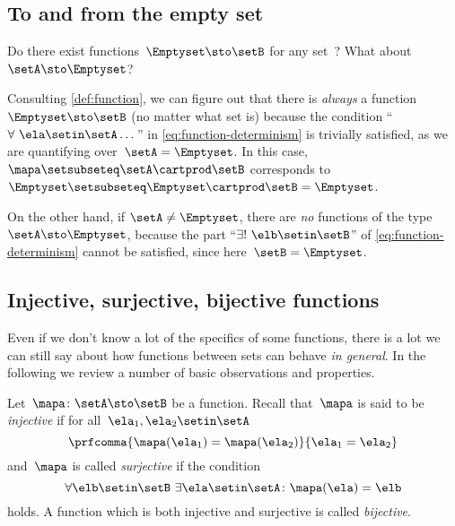 \subsection{To and from the empty set}

Do there exist functions~$\Emptyset \sto \setB$ for any set~\setB?
What about~$\setA \sto \Emptyset$?

Consulting \cref{def:function}, we can figure out that there is \emph{always} a function $\Emptyset \sto \setB$ (no matter what set \setB is) because the condition ``$\forall \ \ela \setin\setA \dots$'' in \cref{eq:function-determinism} is trivially satisfied, as we are quantifying over~$\setA = \Emptyset$.
In this case,~$\mapa \setsubseteq \setA \cartprod \setB$ corresponds to~$\Emptyset \setsubseteq \Emptyset \cartprod \setB = \Emptyset$.

On the other hand, if $\setA \neq \Emptyset$, there are \emph{no} functions of the type~$\setA \sto \Emptyset$, because the part ``$\exists ! \ \elb \setin\setB$'' of \cref{eq:function-determinism} cannot be satisfied, since here~$\setB = \Emptyset$.

\subsection{Injective, surjective, bijective functions}
\label{sub:injective-and-surjective}

Even if we don't know a lot of the specifics of some functions, there is a lot we can still say about how functions between sets can behave \emph{in general}.
In the following we review a number of basic observations and properties.

Let~$\mapa\colon \setA \sto \setB$ be a function.
Recall that~$\mapa$ is said to be \emph{injective} if for all~$\ela_1, \ela_2 \setin\setA$
\begin{equation}
    \label{eq:injectivity-cond}
    \prfcomma{
        \mapa(\ela_1) = \mapa(\ela_2)
    }{
        \ela_1 = \ela_2
    }
\end{equation}
and~$\mapa$ is called \emph{surjective} if the condition
\begin{equation}
    \label{eq:surjectivity-cond}
    \forall \elb \setin\setB \ \exists  \ela \setin\setA \colon \mapa(\ela) = \elb
\end{equation}
holds.
A function which is both injective and surjective is called \emph{bijective}.

